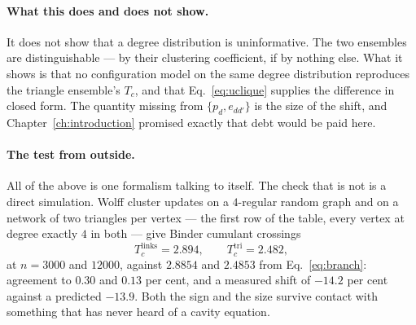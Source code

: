 \paragraph{What this does and does not show.} It does not show that a degree
distribution is uninformative. The two ensembles are distinguishable
--- by their clustering coefficient, if by nothing else. What it shows is that
no configuration model on the same degree distribution reproduces the triangle
ensemble's $T_{c}$, and that Eq.~\eqref{eq:uclique} supplies the difference in
closed form. The quantity missing from $\{p_{d},e_{dd'}\}$ is the size of the
shift, and Chapter~\ref{ch:introduction} promised exactly that debt would be
paid here.

\paragraph{The test from outside.} All of the above is one formalism talking to
itself. The check that is not is a direct simulation. Wolff cluster updates on
a $4$-regular random graph and on a network of two triangles per vertex --- the
first row of the table, every vertex at degree exactly $4$ in both --- give
Binder cumulant crossings
\begin{equation}
  T_{c}^{\mathrm{links}}=2.894,
  \qquad
  T_{c}^{\mathrm{tri}}=2.482,
  \label{eq:mc}
\end{equation}
at $n=3000$ and $12000$, against $2.8854$ and $2.4853$ from
Eq.~\eqref{eq:branch}: agreement to $0.30$ and $0.13$ per cent, and a measured shift
of $-14.2$ per cent against a predicted $-13.9$. Both the sign and the size survive
contact with something that has never heard of a cavity equation.

